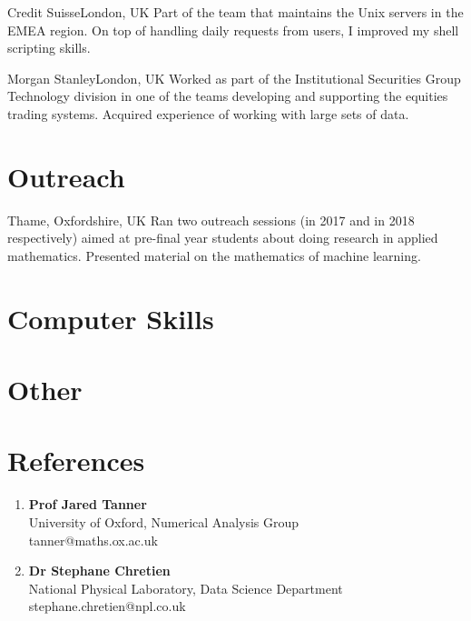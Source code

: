 \documentclass[11pt,a4paper,roman]{moderncv} %
\begin{document}
        {Credit Suisse}{London, UK}{}
        {
          Part of the team that maintains the Unix servers in the 
          EMEA region. On top of handling daily requests from users, 
          I improved my shell scripting skills.
        }

        {Morgan Stanley}{London, UK}{}
        {
          Worked as part of the Institutional Securities Group Technology 
          division in one of the teams developing and supporting the equities 
          trading systems. Acquired experience of working with large sets of data.
        }

\section{Outreach}

        {Thame, Oxfordshire, UK}{}{}
        {
          Ran two outreach sessions (in 2017 and in 2018 respectively) 
          aimed at pre-final year 
          students about doing research in applied mathematics.
          Presented material on the mathematics of machine learning.
        }


\section{Computer Skills}


\section{Other}



\section{References}

\begin{enumerate}

  \item
\textbf{Prof Jared Tanner} \\
University of Oxford, Numerical Analysis Group\\
tanner@maths.ox.ac.uk
\vspace{1em}

  \item
\textbf{Dr Stephane Chretien} \\
National Physical Laboratory, Data Science Department\\
stephane.chretien@npl.co.uk

\end{enumerate}
\end{document}
